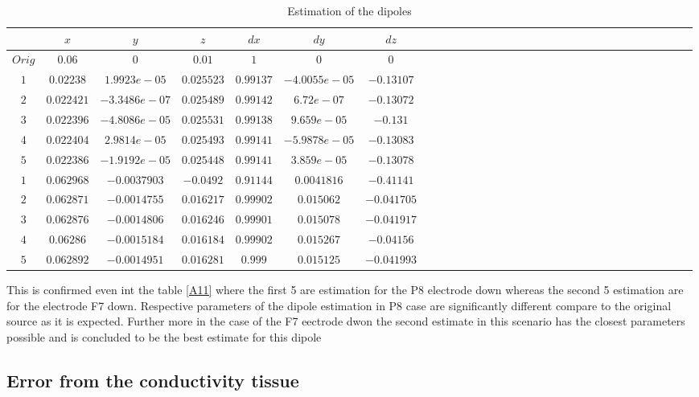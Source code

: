  \begin{table}[!htbp]
\centering
\caption{Estimation of the dipoles}\label{A11}
\label{table:5}
\begin{tabular}{c c c c c c c c c c c c c c c c c c c c c c c c c c c c c c c } 
$ $&$x$&$y$&$z$&$dx$&$dy$&$dz$\\
\hline
$Orig$&$0.06$&$0$&$0.01$&$1$&$0$&$0$\\
\hline
$1$&$0.02238$&$1.9923e-05$&$0.025523$&$0.99137$&$-4.0055e-05$&$-0.13107$\\
$2$&$0.022421$&$-3.3486e-07$&$0.025489$&$0.99142$&$6.72e-07$&$-0.13072$\\
$3$&$0.022396$&$ -4.8086e-05$&$0.025531$&$0.99138$&$9.659e-05$&$-0.131$\\
$4$&$0.022404$&$2.9814e-05$&$0.025493$&$0.99141$&$-5.9878e-05$&$-0.13083$\\
$5$&$0.022386$&$-1.9192e-05$&$0.025448$&$0.99141$&$3.859e-05$&$ -0.13078$\\
$1$&$0.062968$&$-0.0037903$&$ -0.0492$&$0.91144$&$0.0041816$&$-0.41141$\\
$2$&$0.062871$&$-0.0014755$&$ 0.016217$&$0.99902$&$0.015062$&$-0.041705$\\
$3$&$0.062876$&$-0.0014806$&$ 0.016246$&$0.99901$&$0.015078$&$-0.041917$\\
$4$&$0.06286$&$-0.0015184$&$0.016184$&$0.99902$&$0.015267$&$-0.04156$\\
$5$&$0.062892$&$-0.0014951$&$ 0.016281$&$0.999$&$0.015125$&$-0.041993$\\
\hline 

\end{tabular}
\end{table}

This is confirmed even int the table \ref{A11} where the first 5 are estimation for the P8 electrode down whereas the second 5 estimation are for the electrode F7 down. Respective parameters of the dipole estimation in P8 case are significantly different compare to the original source as it is expected. Further more in the case of the F7 eectrode dwon the second estimate in this scenario has the closest parameters possible and is concluded to be the best estimate for this dipole




\subsection{Error from the conductivity tissue}

